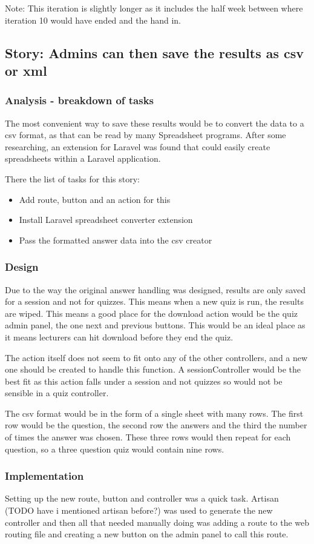 Note: This iteration is slightly longer as it includes the half week between where iteration 10 would have ended and the hand in.

\subsection{Story: Admins can then save the results as csv or xml}
\subsubsection{Analysis - breakdown of tasks}
The most convenient way to save these results would be to convert the data to a csv format, as that can be read by many Spreadsheet programs. After some researching, an extension for Laravel was found that could easily create spreadsheets within a Laravel application\cite{laravel-excel}.

There the list of tasks for this story:
\begin{itemize}
	\item Add route, button and an action for this
	\item Install Laravel spreadsheet converter extension
	\item Pass the formatted answer data into the csv creator
\end{itemize}
\subsubsection{Design}
Due to the way the original answer handling was designed, results are only saved for a session and not for quizzes. This means when a new quiz is run, the results are wiped. This means a good place for the download action would be the quiz admin panel, the one next and previous buttons. This would be an ideal place as it means lecturers can hit download before they end the quiz.

The action itself does not seem to fit onto any of the other controllers, and a new one should be created to handle this function. A sessionController would be the best fit as this action falls under a session and not quizzes so would not be sensible in a quiz controller.

The csv format would be in the form of a single sheet with many rows. The first row would be the question, the second row the answers and the third the number of times the answer was chosen. These three rows would then repeat for each question, so a three question quiz would contain nine rows.
\subsubsection{Implementation}
Setting up the new route, button and controller was a quick task. Artisan (TODO have i mentioned artisan before?) was used to generate the new controller and then all that needed manually doing was adding a route to the web routing file and creating a new button on the admin panel to call this route.

